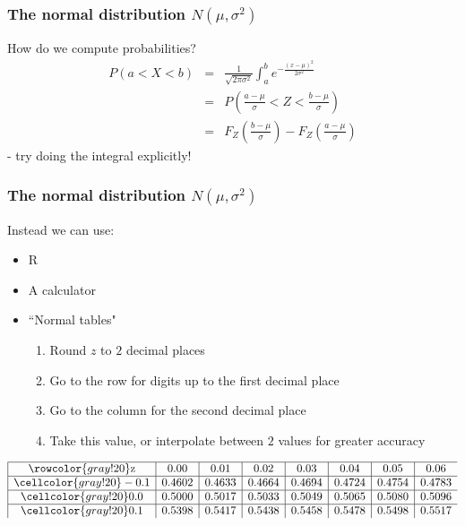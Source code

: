 \documentclass[t,8pt]{beamer}%
\begin{document}
\begin{frame}
	\frametitle{The normal distribution $N(\mu,\sigma^2)$}
	How do we compute probabilities?
    \begin{eqnarray*}
        P(a<X<b)&=&\frac 1{\sqrt{2\pi\sigma^2}}\int_a^be^{-\frac{(x-\mu)^2}{2\sigma^2}}\\
        &=&P\left(\frac{a-\mu}{\sigma}<Z<\frac{b-\mu}{\sigma}\right)\\
        &=&F_Z\left(\frac{b-\mu}{\sigma}\right)-F_Z\left(\frac{a-\mu}{\sigma}\right)
    \end{eqnarray*}
    - try doing the integral explicitly!
\end{frame}

\begin{frame}
	\frametitle{The normal distribution $N(\mu,\sigma^2)$}
	Instead we can use:
    \begin{itemize}
        \item R
        \item A calculator
        \item ``Normal tables"
        \begin{enumerate}
            \item Round $z$ to $2$ decimal places
            \item Go to the row for digits up to the first decimal place
            \item Go to the column for the second decimal place
            \item Take this value, or interpolate between $2$ values for greater accuracy
        \end{enumerate}
    \end{itemize}
\[
\begin{array}{|c|c|c|c|c|c|c|c}
\hline
\rowcolor{gray!20} \text{z} & 0.00 & 0.01 & 0.02 & 0.03 & 0.04 & 0.05 & 0.06 \\
\hline
\cellcolor{gray!20} -0.1 & 0.4602 & 0.4633 & 0.4664 & 0.4694 & 0.4724 & 0.4754 & 0.4783 \\
\hline
\cellcolor{gray!20} 0.0  & 0.5000 & 0.5017 & 0.5033 & 0.5049 & 0.5065 & 0.5080 & 0.5096 \\
\hline
\cellcolor{gray!20} 0.1  & 0.5398 & 0.5417 & 0.5438 & 0.5458 & 0.5478 & 0.5498 & 0.5517 \\
\end{array}
\]
\end{frame}
\end{document}
